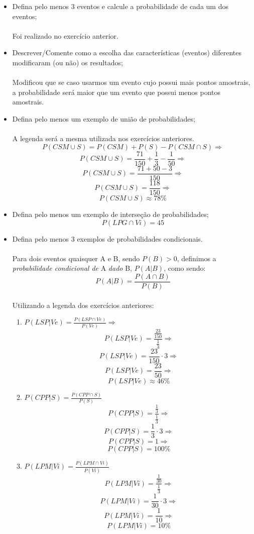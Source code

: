 \documentclass[a4paper, 12pt]{article}
\begin{document}
\begin{itemize}
\begin{itemize}
  \end{itemize}
  

\item Defina pelo menos 3 eventos e calcule a probabilidade de cada um dos eventos;\\\\
  Foi realizado no exercício anterior.

\item Descrever/Comente como a escolha das características (eventos) diferentes modificaram (ou não) os resultados;\\\\
  Modificou que se caso usarmos um evento cujo possui mais pontos amostrais, a probabilidade será maior que um evento que possui menos pontos amostrais.

\item Defina pelo menos um exemplo de união de probabilidades;\\\\
  A legenda será a mesma utilizada nos exercícios anteriores.\\
  $$P(CSM \cup S) = P(CSM) + P(S) - P(CSM \cap S) \Rightarrow$$
  $$P(CSM \cup S) = \frac{71}{150} + \frac{1}{3} - \frac{1}{50} \Rightarrow$$
  $$P(CSM \cup S) = \frac{71+50-3}{150} \Rightarrow$$
  $$P(CSM \cup S) = \frac{118}{150} \Rightarrow$$    
  $$P(CSM \cup S) \approx 78\% $$


\item Defina pelo menos um exemplo de interseção de probabilidades;\\
  $$P(LPG \cap Vi) = 45 $$

\item Defina pelo menos 3 exemplos de probabilidades condicionais. \\\\
  Para dois eventos quaisquer A e B, sendo $P(B)>0$, definimos a \emph{probabilidade condicional de} A \emph{dado} B, $P(A|B)$, como sendo:\\
  $$P(A|B)=\frac{P(A \cap B)}{P(B)}$$\\
  Utilizando a legenda dos exercícios anteriores:\\
  \begin{enumerate}
  \item $P(LSP|Ve)=\frac{P(LSP \cap Ve)}{P(Ve)} \Rightarrow$
    $$P(LSP|Ve)=\frac{\frac{23}{150}}{\frac{1}{3}} \Rightarrow$$
    $$P(LSP|Ve)=\frac{23}{150}\cdot3 \Rightarrow$$
    $$P(LSP|Ve)=\frac{23}{50} \Rightarrow$$
    $$P(LSP|Ve)\approx46\% $$
    
  \item $P(CPP|S)=\frac{P(CPP \cap S)}{P(S)}$
   $$P(CPP|S)=\frac{\frac{1}{3}}{\frac{1}{3}} \Rightarrow$$
   $$P(CPP|S)=\frac{1}{3}\cdot3 \Rightarrow$$
   $$P(CPP|S)=1 \Rightarrow$$
   $$P(CPP|S)=100\% $$
     
  \item $P(LPM|Vi)=\frac{P(LPM \cap Vi)}{P(Vi)}$
   $$P(LPM|Vi)=\frac{\frac{1}{30}}{\frac{1}{3}} \Rightarrow$$
   $$P(LPM|Vi)=\frac{1}{30}\cdot3 \Rightarrow$$
   $$P(LPM|Vi)=\frac{1}{10} \Rightarrow$$
   $$P(LPM|Vi)=10\% $$
     
  \end{enumerate}
  

\end{itemize}
\end{document}
